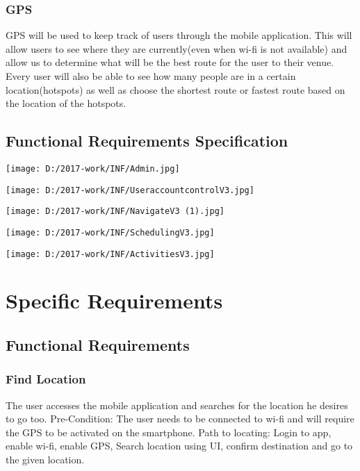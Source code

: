 \documentclass{article}
\begin{document}
\subsubsection{GPS}
GPS will be used to keep track of users through the mobile application. This will allow users to see where they are currently(even when wi-fi is not available) and allow us to determine what will be the best route for the user to their venue. Every user will also be able to see how many people are in a certain location(hotspots) as well as choose the shortest route or fastest route based on the location of the hotspots.
\subsection {Functional Requirements Specification}
\begin{center}
 \vfill
  \begin{center}    
	\texttt{[image: D:/2017-work/INF/Admin.jpg]}
  \end{center}
  \vfill
\newpage
 \vfill
  \begin{center}    
	\texttt{[image: D:/2017-work/INF/UseraccountcontrolV3.jpg]}
  \end{center}
  \vfill

\newpage
 \vfill
  \begin{center}    
	\texttt{[image: D:/2017-work/INF/NavigateV3 (1).jpg]}
  \end{center}
  \vfill

\newpage
 \vfill
  \begin{center}    
	\texttt{[image: D:/2017-work/INF/SchedulingV3.jpg]}
  \end{center}
  \vfill




 \vfill
  \begin{center}    
	\texttt{[image: D:/2017-work/INF/ActivitiesV3.jpg]}
  \end{center}
  \vfill

\newpage
\centering
\section{Specific Requirements}
\subsection{Functional Requirements}
\subsubsection{Find Location}
The user accesses the mobile application and searches for the location he desires to go too. Pre-Condition: The user needs to be connected to wi-fi and will require the GPS to be activated on the smartphone. Path to locating: Login to app, enable wi-fi, enable GPS, Search location using UI, confirm destination and go to the given location.


\end{center}
\end{document}
